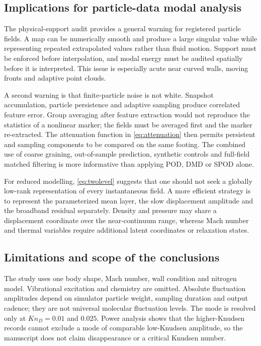 \documentclass[paper]{JFM-FLM_Au}
\newcommand{\KnD}{Kn_D}
\begin{document}
\subsection{Implications for particle-data modal analysis}
The physical-support audit provides a general warning for registered particle fields. A map can be numerically smooth and produce a large singular value while representing repeated extrapolated values rather than fluid motion. Support must be enforced before interpolation, and modal energy must be audited spatially before it is interpreted. This issue is especially acute near curved walls, moving fronts and adaptive point clouds.

A second warning is that finite-particle noise is not white. Snapshot accumulation, particle persistence and adaptive sampling produce correlated feature error. Group averaging after feature extraction would not reproduce the statistics of a nonlinear marker; the fields must be averaged first and the marker re-extracted. The attenuation function in \cref{eq:attenuation} then permits persistent and sampling components to be compared on the same footing. The combined use of coarse graining, out-of-sample prediction, synthetic controls and full-field matched filtering is more informative than applying POD, DMD or SPOD alone.

For reduced modelling, \cref{eq:twolevel} suggests that one should not seek a globally low-rank representation of every instantaneous field. A more efficient strategy is to represent the parameterized mean layer, the slow displacement amplitude and the broadband residual separately. Density and pressure may share a displacement coordinate over the near-continuum range, whereas Mach number and thermal variables require additional latent coordinates or relaxation states.

\subsection{Limitations and scope of the conclusions}
The study uses one body shape, Mach number, wall condition and nitrogen model. Vibrational excitation and chemistry are omitted. Absolute fluctuation amplitudes depend on simulator particle weight, sampling duration and output cadence; they are not universal molecular fluctuation levels. The mode is resolved only at $\KnD=0.01$ and $0.025$. Power analysis shows that the higher-Knudsen records cannot exclude a mode of comparable low-Knudsen amplitude, so the manuscript does not claim disappearance or a critical Knudsen number.
\end{document}
